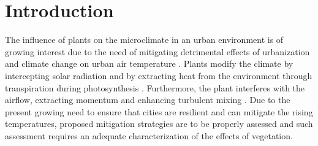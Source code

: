 \section{Introduction}

The influence of plants on the microclimate in an urban environment is of growing interest due to the need of mitigating detrimental effects of urbanization and climate change on urban air temperature \citep{Chen2006,Demuzere2014,Dimoudi2003,Matthews2017,Shashua-Bar2009b,Shashua-Bar2000a}. Plants modify the climate by intercepting solar radiation and by extracting heat from the environment through transpiration during photosynthesis \citep{nobel2009physicochemical}. Furthermore, the plant interferes with the airflow, extracting momentum and enhancing turbulent mixing \citep{Finnigan2009, Gromke2014, Sanz2003}. Due to the present growing need to ensure that cities are resilient and can mitigate the rising temperatures, proposed mitigation strategies are to be properly assessed and such assessment requires an adequate characterization of the effects of vegetation. 


